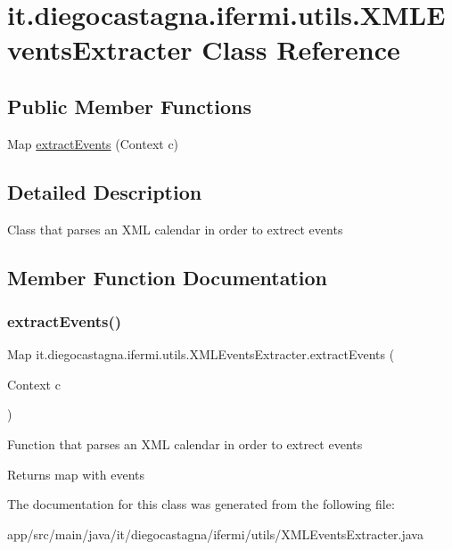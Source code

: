 \hypertarget{classit_1_1diegocastagna_1_1ifermi_1_1utils_1_1_x_m_l_events_extracter}{}\section{it.\+diegocastagna.\+ifermi.\+utils.\+X\+M\+L\+Events\+Extracter Class Reference}
\label{classit_1_1diegocastagna_1_1ifermi_1_1utils_1_1_x_m_l_events_extracter}
\subsection*{Public Member Functions}
\begin{DoxyCompactItemize}
\item 
Map \mbox{\hyperlink{classit_1_1diegocastagna_1_1ifermi_1_1utils_1_1_x_m_l_events_extracter_aa96b62d43dffdad3635220ac77501475}{extract\+Events}} (Context c)
\end{DoxyCompactItemize}


\subsection{Detailed Description}
Class that parses an X\+ML calendar in order to extrect events 

\subsection{Member Function Documentation}
\mbox{\label{classit_1_1diegocastagna_1_1ifermi_1_1utils_1_1_x_m_l_events_extracter_aa96b62d43dffdad3635220ac77501475}} 
\subsubsection{\texorpdfstring{extractEvents()}{extractEvents()}}
{\footnotesize\ttfamily Map it.\+diegocastagna.\+ifermi.\+utils.\+X\+M\+L\+Events\+Extracter.\+extract\+Events (\begin{DoxyParamCaption}\item[{Context}]{c }\end{DoxyParamCaption})\hspace{0.3cm}{\ttfamily [inline]}}

Function that parses an X\+ML calendar in order to extrect events \begin{DoxyReturn}{Returns}
map with events 
\end{DoxyReturn}


The documentation for this class was generated from the following file\+:\begin{DoxyCompactItemize}
\item 
app/src/main/java/it/diegocastagna/ifermi/utils/X\+M\+L\+Events\+Extracter.\+java\end{DoxyCompactItemize}
